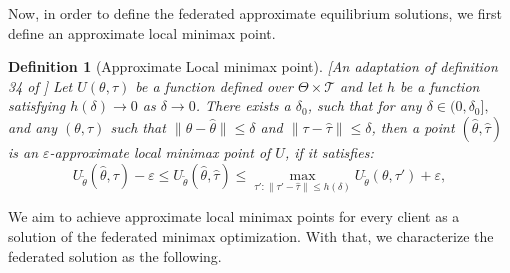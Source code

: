\documentclass{article}
\let\cite\relax
\newcommand*{\cite}{\citep}
\newtheorem{definition}{Definition}%
\theoremstyle{definition}
\begin{document}
Now, in order to define the federated approximate equilibrium solutions, we first define an approximate local minimax point.
\begin{definition}[Approximate Local minimax point][An adaptation of definition 34 of \cite{pmlr-v119-jin20e}]
	\label{def:approxepsilonlocalequilibrium}
	Let $U(\theta, \tau)$ be a function defined over $\Theta \times \mathcal{T} $ and let $h$ be a function satisfying $h(\delta)\rightarrow0$ as $\delta\rightarrow0$. There exists a $\delta_0$, such that for any $\delta\in(0,\delta_0],$ and any $(\theta,\tau)$ such that $\|\theta-\hat\theta\|\leq \delta$ and $\|\tau-\hat\tau\|\leq\delta$, then a point $(\hat\theta,\hat\tau)$ is an $\varepsilon$-approximate local minimax point of $U$, if it satisfies:
		\begin{equation}
			\label{eqn:approxlocalequilibrium}
			U_{\tilde\theta}(\hat\theta,\tau)-\varepsilon\leq U_{\tilde\theta}(\hat\theta,\hat\tau)\leq {\max_{{\tau\prime : \|\tau\prime-\hat\tau\|\leq h(\delta)}}U_{\tilde\theta}(\theta,\tau\prime)}+\varepsilon,
		\end{equation}
\end{definition}
We aim to achieve approximate local minimax points for every client as a solution of the federated minimax optimization. With that, we characterize the federated solution as the following. 
\end{document}
